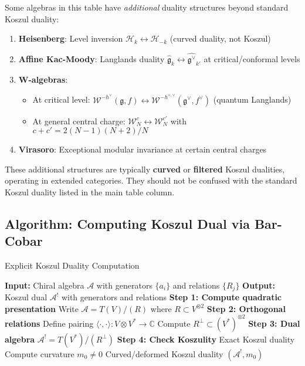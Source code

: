 \begin{remark}\label{rem:additional-dualities}
Some algebras in this table have \emph{additional} duality structures beyond standard Koszul duality:

\begin{enumerate}
\item \textbf{Heisenberg}: Level inversion $\mathcal{H}_k \leftrightarrow \mathcal{H}_{-k}$ (curved duality, not Koszul)

\item \textbf{Affine Kac-Moody}: Langlands duality $\widehat{\mathfrak{g}}_k \leftrightarrow \widehat{\mathfrak{g}^\vee}_{k'}$ at critical/conformal levels

\item \textbf{W-algebras}: 
   \begin{itemize}
   \item At critical level: $\mathcal{W}^{-h^\vee}(\mathfrak{g}, f) \leftrightarrow \mathcal{W}^{-h^{\vee,\vee}}(\mathfrak{g}^\vee, f^\vee)$ (quantum Langlands)
   \item At general central charge: $\mathcal{W}_N^c \leftrightarrow \mathcal{W}_N^{c'}$ with $c + c' = 2(N-1)(N+2)/N$
   \end{itemize}

\item \textbf{Virasoro}: Exceptional modular invariance at certain central charges
\end{enumerate}

These additional structures are typically \textbf{curved} or \textbf{filtered} Koszul dualities, operating in extended categories. They should not be confused with the standard Koszul duality listed in the main table column.
\end{remark}

\subsection{Algorithm: Computing Koszul Dual via Bar-Cobar}

\begin{algorithm}[htbp]
\caption{Explicit Koszul Duality Computation}
\begin{algorithmic}[1]
\State \textbf{Input:} Chiral algebra $\mathcal{A}$ with generators $\{a_i\}$ and relations $\{R_j\}$
\State \textbf{Output:} Koszul dual $\mathcal{A}^!$ with generators and relations
\State
\State \textbf{Step 1: Compute quadratic presentation}
\State Write $\mathcal{A} = T(V)/(R)$ where $R \subset V^{\otimes 2}$
\State
\State \textbf{Step 2: Orthogonal relations}
\State Define pairing $\langle \cdot, \cdot \rangle: V \otimes V^* \to \mathbb{C}$
\State Compute $R^\perp \subset (V^*)^{\otimes 2}$
\State
\State \textbf{Step 3: Dual algebra}
\State $\mathcal{A}^! = T(V^*)/(R^\perp)$
\State
\State \textbf{Step 4: Check Koszulity}
    \State Exact Koszul duality
\Else
    \State Compute curvature $m_0 \neq 0$
    \State Curved/deformed Koszul duality
\EndIf
\State
\State \Return $(\mathcal{A}^!, m_0)$
\end{algorithmic}
\end{algorithm}

